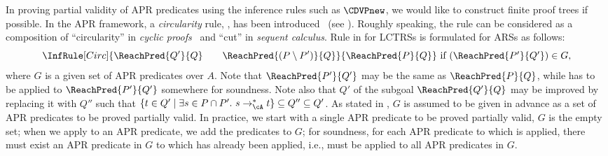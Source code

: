 In proving partial validity of APR predicates using the inference rules such as $\CDVPnew$, we would like to construct finite proof trees if possible.
In the APR framework, a \emph{circularity} rule, , has been introduced~\cite[Definition~12]{CL18} (see ).
Roughly speaking, the rule can be considered as a composition of ``circularity'' in \emph{cyclic proofs}~\cite{Bro05} and ``cut'' in \emph{sequent calculus}.
Rule  in  for LCTRSs is formulated for ARSs as follows:
\[
	\InfRule[Circ]{\ReachPred{Q'}{Q}
		\qquad
		\ReachPred{(P \setminus P')}{Q}
	}{\ReachPred{P}{Q}
	}
	~\mbox{if $(\ReachPred{P'}{Q'}) \in G$,}
\]
where $G$ is a given set of APR predicates over $A$.
Note that $\ReachPred{P'}{Q'}$ may be the same as $\ReachPred{P}{Q}$, while  has to be applied to $\ReachPred{P'}{Q'}$ somewhere for soundness.
Note also that $Q'$ of the subgoal $\ReachPred{Q'}{Q}$ may be improved by replacing it with $Q''$ such that $\{ t \in Q' \mid \exists s \in P\cap P'.\ s \mathrel{\to_\cA^*} t \} \subseteq Q'' \subseteq Q'$.
As stated in , $G$ is assumed to be given in advance as a set of APR predicates to be proved partially valid.
In practice, we start with a single APR predicate to be proved partially valid, $G$ is the empty set;
when we apply  to an APR predicate, we add the predicates to $G$;
for soundness, for each APR predicate to which  is applied, there must exist an APR predicate in $G$ to which  has already been applied, i.e.,
 must be applied to all APR predicates in $G$.

